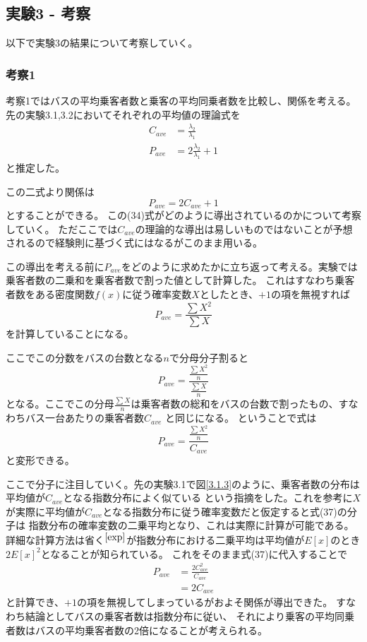 \documentclass[a4paper,11pt,dvipdfmx]{jsarticle}
\begin{document}
\subsection{実験3 - 考察}
以下で実験3の結果について考察していく。
\subsubsection{考察1}
考察1ではバスの平均乗客者数と乗客の平均同乗者数を比較し、関係を考える。先の実験3.1,3.2においてそれぞれの平均値の理論式を
\begin{align}
    C_{ave} &= \frac{\lambda_2}{\lambda_1} \\
    P_{ave} &= 2\frac{\lambda_2}{\lambda_1}+1
\end{align}
と推定した。

この二式より関係は
\begin{equation}
    P_{ave} = 2C_{ave}+1
\end{equation}
とすることができる。
この(34)式がどのように導出されているのかについて考察していく。
ただここでは$C_{ave}$の理論的な導出は易しいものではないことが予想されるので経験則に基づく式にはなるがこのまま用いる。

この導出を考える前に$P_{ave}$をどのように求めたかに立ち返って考える。実験では乗客者数の二乗和を乗客者数で割った値として計算した。
これはすなわち乗客者数をある密度関数$f(x)$に従う確率変数$X$としたとき、$+1$の項を無視すれば
\begin{equation}
    P_{ave} = \frac{\sum X^2}{\sum X}
\end{equation}
を計算していることになる。

ここでこの分数をバスの台数となる$n$で分母分子割ると
\begin{equation}
    P_{ave} = \frac{\frac{\sum X^2}{n}}{\frac{\sum X}{n}}
\end{equation}
となる。ここでこの分母$\frac{\sum X}{n}$は乗客者数の総和をバスの台数で割ったもの、すなわちバス一台あたりの乗客者数$C_{ave}$
と同じになる。
ということで式は
\begin{equation}
    P_{ave} = \frac{\frac{\sum X^2}{n}}{C_{ave}}
\end{equation}
と変形できる。

ここで分子に注目していく。先の実験3.1で図\ref{3.1.3}のように、乗客者数の分布は平均値が$C_{ave}$となる指数分布によく似ている
という指摘をした。これを参考に$X$が実際に平均値が$C_{ave}$となる指数分布に従う確率変数だと仮定すると式(37)の分子は
指数分布の確率変数の二乗平均となり、これは実際に計算が可能である。
詳細な計算方法は省く$^{\cite{exp}}$が指数分布における二乗平均は平均値が$E[x]$のとき$2E[x]^2$となることが知られている。
これをそのまま式(37)に代入することで
\begin{align}
    P_{ave} &= \frac{2C_{ave}^2}{C_{ave}} \\
            &= 2C_{ave}
\end{align}
と計算でき、$+1$の項を無視してしまっているがおよそ関係が導出できた。
すなわち結論としてバスの乗客者数は指数分布に従い、
それにより乗客の平均同乗者数はバスの平均乗客者数の2倍になることが考えられる。
\end{document}
